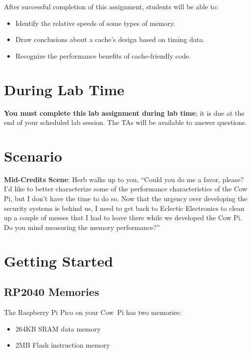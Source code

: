 After successful completion of this assignment, students will be able to:
\begin{itemize}
\item Identify the relative speeds of some types of memory.
\item Draw conclusions about a cache's design based on timing data.
\item Recognize the performance benefits of cache-friendly code.
\end{itemize}


\section*{During Lab Time}

\textbf{You must complete this lab assignment during lab time}; it is due at the
end of your scheduled lab session. The TAs will be available to answer
questions.

\section{Scenario}

{\large \textbf{Mid-Credits Scene}:} Herb walks up to you. ``Could you do me a
favor, please? I'd like to better characterize some of the performance
characteristics of the Cow Pi, but I don't have the time to do so. Now that the
urgency over developing the security systems is behind us, I need to get back to
Eclectic Electronics to clean up a couple of messes that I had to leave there
while we developed the Cow Pi. Do you mind measuring the memory performance?''


\section{Getting Started}

\subsection{RP2040 Memories}

The Raspberry Pi Pico on your Cow~Pi has two memories:

\begin{itemize}
    \item 264KB SRAM data memory
    \item 2MB Flash instruction memory
\end{itemize}

